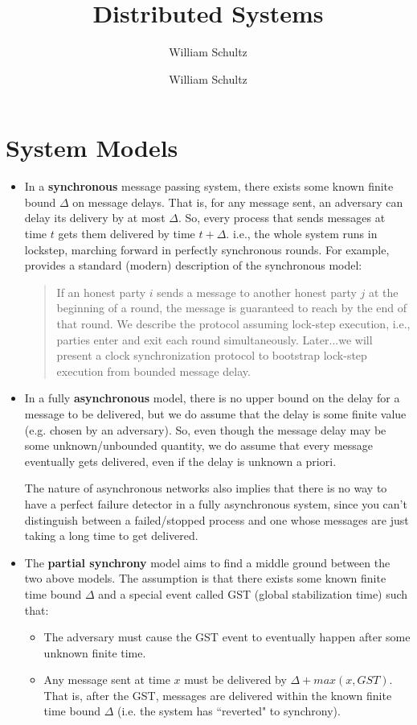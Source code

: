 \documentclass[10pt,a4paper]{article}
\author{William Schultz}
\begin{document}
\title{Distributed Systems}
\author{William Schultz}
\maketitle

\section{System Models}

\begin{itemize}
    \item In a \textbf{synchronous} message passing system, there exists some known finite bound $\Delta$ on message delays. That is, for any message sent, an adversary can delay its delivery by at most $\Delta$. So, every process that sends messages at time $t$ gets them delivered by time $t+\Delta$. i.e., the whole system runs in lockstep, marching forward in perfectly synchronous rounds. For example, \cite{2018abrahamsyncbyz} provides a standard (modern) description of the synchronous model: 
    
    \begin{quote}
    If an honest party $i$ sends a message to another honest party $j$ at the beginning of a round, the message is guaranteed to reach by the end of that round. We describe the protocol assuming lock-step execution, i.e., parties enter and exit each round simultaneously. Later...we will present a clock synchronization protocol to bootstrap lock-step execution from bounded message delay.
    \end{quote}
    
    \item  In a fully \textbf{asynchronous} model, there is no upper bound on the delay for a message to be delivered, but we do assume that the delay is some finite value (e.g. chosen by an adversary).  So, even though the message delay may be some unknown/unbounded quantity, we do assume that every message eventually gets delivered, even if the delay is unknown a priori.
    
    The nature of asynchronous networks also implies that there is no way to have a perfect failure detector in a fully asynchronous system, since you can't distinguish between a failed/stopped process and one whose messages are just taking a long time to get delivered.

    \item The \textbf{partial synchrony} model aims to find a middle ground between the two above models. The assumption is that there exists some known finite time bound $\Delta$ and a special event called GST (global stabilization time) such that:
    \begin{itemize}
        \item The adversary must cause the GST event to eventually happen after some unknown finite time.
        \item Any message sent at time $x$ must be delivered by $\Delta + max(x, GST)$. That is, after the GST, messages are delivered within the known finite time bound $\Delta$ (i.e. the system has ``reverted" to synchrony).
    \end{itemize}
\end{itemize}
\end{document}
